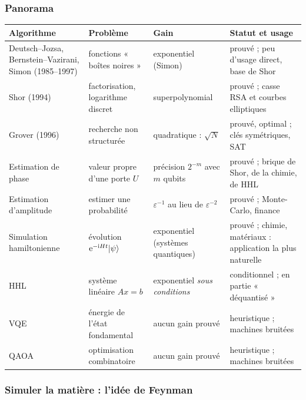 \subsubsection{Panorama}

\begin{center}
\renewcommand{\arraystretch}{1.2}
\small
\begin{tabular}{@{}>{\raggedright\arraybackslash}p{3.1cm}>{\raggedright\arraybackslash}p{3.8cm}>{\raggedright\arraybackslash}p{3.0cm}>{\raggedright\arraybackslash}p{4.6cm}@{}}
\toprule
\textbf{Algorithme} & \textbf{Problème} & \textbf{Gain} & \textbf{Statut et usage}\\
\midrule
Deutsch--Jozsa, Bernstein--Vazirani, Simon (1985--1997) & fonctions « boîtes noires » & exponentiel (Simon) & prouvé ; peu d'usage direct, base de Shor\\
Shor (1994) \parencite{shor1997} & factorisation, logarithme discret & superpolynomial & prouvé ; casse RSA et courbes elliptiques\\
Grover (1996) & recherche non structurée & quadratique : $\sqrt N$ & prouvé, optimal ; clés symétriques, SAT\\
Estimation de phase \parencite{kitaev1995} & valeur propre d'une porte $U$ & précision $2^{-m}$ avec $m$ qubits & prouvé ; brique de Shor, de la chimie, de HHL\\
Estimation d'amplitude \parencite{brassard2002} & estimer une probabilité & $\varepsilon^{-1}$ au lieu de $\varepsilon^{-2}$ & prouvé ; Monte-Carlo, finance\\
Simulation hamiltonienne \parencite{lloyd1996} & évolution $\mathrm{e}^{-\mathrm{i} Ht}|\psi\rangle$ & exponentiel (systèmes quantiques) & prouvé ; chimie, matériaux : application la plus naturelle\\
HHL \parencite{harrow2009} & système linéaire $Ax=b$ & exponentiel \emph{sous conditions} & conditionnel ; en partie « déquantisé » \parencite{tang2019}\\
VQE \parencite{peruzzo2014} & énergie de l'état fondamental & aucun gain prouvé & heuristique ; machines bruitées\\
QAOA \parencite{farhi2014} & optimisation combinatoire & aucun gain prouvé & heuristique ; machines bruitées\\
\bottomrule
\end{tabular}
\end{center}

\subsubsection{Simuler la matière : l'idée de Feynman}

